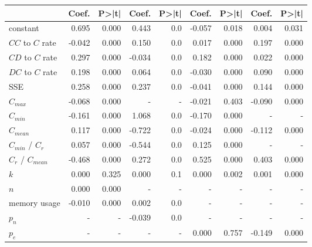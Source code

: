 \begin{tabular}{lrrrrrrrr}
\toprule
{} &  Coef. &  P>|t| &  Coef. &  P>|t| &  Coef. &  P>|t| &  Coef. &  P>|t| \\
\midrule
constant           &  0.695 &  0.000 &  0.443 &    0.0 & -0.057 &  0.018 &  0.004 &  0.031 \\
$CC$ to $C$ rate   & -0.042 &  0.000 &  0.150 &    0.0 &  0.017 &  0.000 &  0.197 &  0.000 \\
$CD$ to $C$ rate   &  0.297 &  0.000 & -0.034 &    0.0 &  0.182 &  0.000 &  0.022 &  0.000 \\
$DC$ to $C$ rate   &  0.198 &  0.000 &  0.064 &    0.0 & -0.030 &  0.000 &  0.090 &  0.000 \\
SSE                &  0.258 &  0.000 &  0.237 &    0.0 & -0.041 &  0.000 &  0.144 &  0.000 \\
$C_{max}$          & -0.068 &  0.000 &      - &      - & -0.021 &  0.403 & -0.090 &  0.000 \\
$C_{min}$          & -0.161 &  0.000 &  1.068 &    0.0 & -0.170 &  0.000 &      - &      - \\
$C_{mean}$         &  0.117 &  0.000 & -0.722 &    0.0 & -0.024 &  0.000 & -0.112 &  0.000 \\
$C_{min}$ / $C_r$  &  0.057 &  0.000 & -0.544 &    0.0 &  0.125 &  0.000 &      - &      - \\
$C_r$ / $C_{mean}$ & -0.468 &  0.000 &  0.272 &    0.0 &  0.525 &  0.000 &  0.403 &  0.000 \\
$k$                &  0.000 &  0.325 &  0.000 &    0.1 &  0.000 &  0.002 &  0.001 &  0.000 \\
$n$                &  0.000 &  0.000 &      - &      - &      - &      - &      - &      - \\
memory usage       & -0.010 &  0.000 &  0.002 &    0.0 &      - &      - &      - &      - \\
$p_n$              &      - &      - & -0.039 &    0.0 &      - &      - &      - &      - \\
$p_e$              &      - &      - &      - &      - &  0.000 &  0.757 & -0.149 &  0.000 \\
\bottomrule
\end{tabular}

